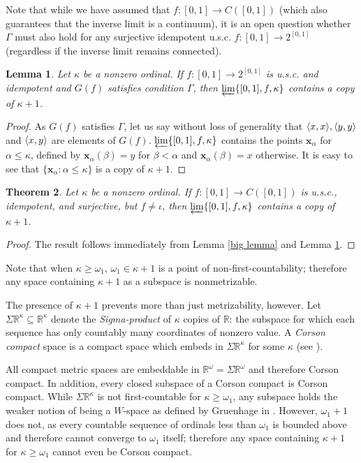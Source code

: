 \documentclass{amsart}
\newtheorem{theorem}{Theorem}[section]
\newtheorem{lemma}[theorem]{Lemma}
\theoremstyle{definition}
\begin{document}
Note that while we have assumed that $f:[0,1]\to C([0,1])$ (which also guarantees that the inverse limit is a continuum), it is an open question whether $\Gamma$ must also hold for any surjective idempotent u.s.c. $f:[0,1]\to 2^{[0,1]}$ (regardless if the inverse limit remains connected).

\begin{lemma} \label{general lemma}
Let $\kappa$ be a nonzero ordinal. If $f:[0,1] \to 2^{[0,1]}$ is u.s.c. and idempotent and $G(f)$ satisfies condition $\Gamma$, then $\varprojlim\{[0,1],f,\kappa\}$ contains a copy of $\kappa + 1$.
\end{lemma}

\begin{proof}
As $G(f)$ satisfies $\Gamma$, let us say without loss of generality that $\langle x,x\rangle, \langle y,y\rangle$ and $\langle x,y\rangle$ are elements of $G(f)$. $\varprojlim\{[0,1],f,\kappa\}$ contains the points $\textbf{x}_\alpha$ for $\alpha\leq\kappa$, defined by $\textbf{x}_\alpha(\beta)=y$ for $\beta<\alpha$ and $\textbf{x}_\alpha(\beta)=x$ otherwise. It is easy to see that $\{\textbf{x}_\alpha:\alpha\leq\kappa\}$ is a copy of $\kappa+1$.
\end{proof}

\begin{theorem} \label{main theorem}
Let $\kappa$ be a nonzero ordinal. If $f:[0,1]\to C([0,1])$ is u.s.c., idempotent, and surjective, but $f\not=\iota$, then $\varprojlim\{[0,1],f,\kappa\}$ contains a copy of $\kappa+1$.
\end{theorem}

\begin{proof}
The result follows immediately from Lemma \ref{big lemma} and Lemma \ref{general lemma}.
\end{proof}

Note that when $\kappa\geq\omega_1$, $\omega_1\in\kappa+1$ is a point of non-first-countability; therefore any space containing $\kappa+1$ as a subspace is nonmetrizable.

The presence of $\kappa+1$ prevents more than just metrizability, however. Let $\Sigma\mathbb R^\kappa\subseteq \mathbb R^\kappa$ denote the \textit{Sigma-product} of $\kappa$ copies of $\mathbb R$: the subspace for which each sequence has only countably many coordinates of nonzero value. A \textit{Corson compact} space is a compact space which embeds in $\Sigma\mathbb R^\kappa$ for some $\kappa$ (see \cite{alster}).

All compact metric spaces are embeddable in $\mathbb R^\omega=\Sigma\mathbb R^\omega$ and therefore Corson compact. In addition, every closed subspace of a Corson compact is Corson compact. While $\Sigma\mathbb R^\kappa$ is not first-countable for $\kappa\geq\omega_1$, any subspace holds the weaker notion of being a $W$-space as defined by Gruenhage in \cite{gruenhage}. However, $\omega_1+1$ does not, as every countable sequence of ordinals less than $\omega_1$ is bounded above and therefore cannot converge to $\omega_1$ itself; therefore any space containing $\kappa+1$ for $\kappa\geq\omega_1$ cannot even be Corson compact.
\end{document}
